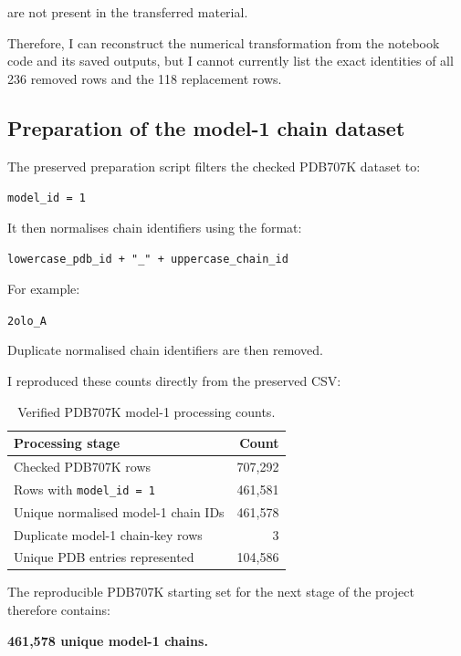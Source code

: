 \documentclass[11pt,a4paper]{article}
\begin{document}
are not present in the transferred material.

Therefore, I can reconstruct the numerical transformation from the notebook code and its saved outputs, but I cannot currently list the exact identities of all 236 removed rows and the 118 replacement rows.


\subsection{Preparation of the model-1 chain dataset}

The preserved preparation script filters the checked PDB707K dataset to:

\begin{center}
\texttt{model\_id = 1}
\end{center}

It then normalises chain identifiers using the format:

\begin{center}
\texttt{lowercase\_pdb\_id + "\_" + uppercase\_chain\_id}
\end{center}

For example:

\begin{center}
\texttt{2olo\_A}
\end{center}

Duplicate normalised chain identifiers are then removed.

I reproduced these counts directly from the preserved CSV:

\begin{table}[h]
\centering
\begin{tabular}{lr}
\toprule
\textbf{Processing stage} & \textbf{Count} \\
\midrule
Checked PDB707K rows & 707,292 \\
Rows with \texttt{model\_id = 1} & 461,581 \\
Unique normalised model-1 chain IDs & 461,578 \\
Duplicate model-1 chain-key rows & 3 \\
Unique PDB entries represented & 104,586 \\
\bottomrule
\end{tabular}
\caption{Verified PDB707K model-1 processing counts.}
\end{table}

The reproducible PDB707K starting set for the next stage of the project therefore contains:

\begin{center}
\textbf{461,578 unique model-1 chains.}
\end{center}
\end{document}

